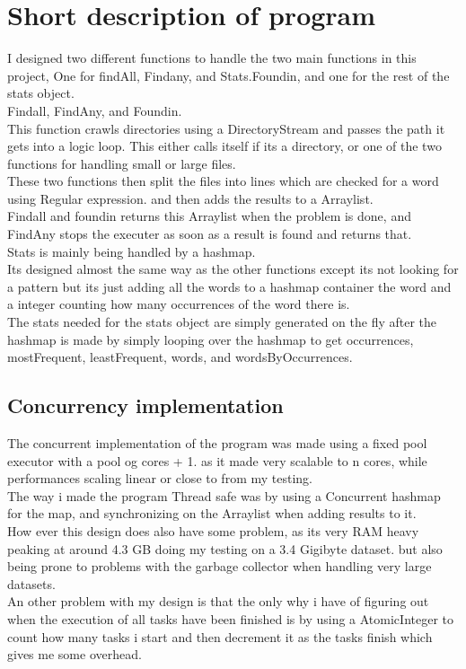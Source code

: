 \documentclass[a4paper,10pt,titlepage]{report}
\begin{document}
\section{Short description of program}
I designed two different functions to handle the two main functions in this project, One for findAll, Findany, and Stats.Foundin, and one for the rest of the stats object. \\
Findall, FindAny, and Foundin. \\
This function crawls directories using a DirectoryStream and passes the path it gets into a logic loop. This either calls itself if its a directory, or one of the two functions for handling small or large files. \\
These two functions then split the files into lines which are checked for a word using Regular expression. and then adds the results to a Arraylist. \\
Findall and foundin returns this Arraylist when the problem is done, and FindAny stops the executer as soon as a result is found and returns that. \\

Stats is mainly being handled by a hashmap. \\
Its designed almost the same way as the other functions except its not looking for a pattern but its just adding all the words to a hashmap container the word and a integer counting how many occurrences of the word there is. \\
The stats needed for the stats object are simply generated on the fly after the hashmap is made by simply looping over the hashmap to get occurrences, mostFrequent, leastFrequent, words, and wordsByOccurrences.\\
\vspace*{5mm}


\subsection{Concurrency implementation}
The concurrent implementation of the program was made using a fixed pool executor with a pool og cores + 1. as it made very scalable to n cores, while performances scaling linear or close to from my testing. \\
The way i made the program Thread safe was by using a Concurrent hashmap for the map, and synchronizing on the Arraylist when adding results to it.\\
How ever this design does also have some problem, as its very RAM heavy peaking at around 4.3 GB doing my testing on a 3.4 Gigibyte dataset. but also being prone to problems with the garbage collector when handling very large datasets.\\
An other problem with my design is that the only why i have of figuring out when the execution of all tasks have been finished is by using a AtomicInteger to count how many tasks i start and then decrement it as the tasks finish which gives me some overhead.
\end{document}

